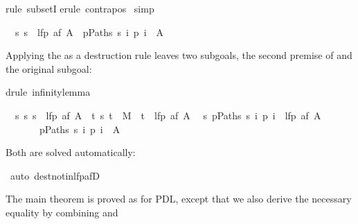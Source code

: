 \begin{isabellebody}
\begin{isamarkuptxt}
\end{isamarkuptxt}%
rule\ subsetI{\isacharparenright}\isanewline
{}erule\ contrapos\isanewline
{}\ simp%
\begin{isamarkuptxt}%
\begin{isabelle}
\ \ {\isasymAnd}s{\isachardot}\ s\ {\isasymnotin}\ lfp\ {\isacharparenleft}af\ A{\isacharparenright}\ {\isasymLongrightarrow}\ {\isasymexists}p{\isasymin}Paths\ s{\isachardot}\ {\isasymforall}i{\isachardot}\ p\ i\ {\isasymnotin}\ A
\end{isabelle}
Applying the  as a destruction rule leaves two subgoals, the second
premise of  and the original subgoal:%
\end{isamarkuptxt}%
drule\ infinity{\isacharunderscore}lemma{\isacharparenright}%
\begin{isamarkuptxt}%
\begin{isabelle}
\ \ {\isasymAnd}s{\isachardot}\ {\isasymforall}s{\isachardot}\ s\ {\isasymnotin}\ lfp\ {\isacharparenleft}af\ A{\isacharparenright}\ {\isasymlongrightarrow}\ {\isacharparenleft}{\isasymexists}t{\isachardot}\ {\isacharparenleft}s{\isacharcomma}\ t{\isacharparenright}\ {\isasymin}\ M\ {\isasymand}\ t\ {\isasymnotin}\ lfp\ {\isacharparenleft}af\ A{\isacharparenright}{\isacharparenright}\isanewline
\ \ {\isasymAnd}s{\isachardot}\ {\isasymexists}p{\isasymin}Paths\ s{\isachardot}\ {\isasymforall}i{\isachardot}\ p\ i\ {\isasymnotin}\ lfp\ {\isacharparenleft}af\ A{\isacharparenright}\isanewline
\ \ \ \ \ \ {\isasymLongrightarrow}\ {\isasymexists}p{\isasymin}Paths\ s{\isachardot}\ {\isasymforall}i{\isachardot}\ p\ i\ {\isasymnotin}\ A
\end{isabelle}
Both are solved automatically:%
\end{isamarkuptxt}%
\ auto\ dest{\isacharcolon}not{\isacharunderscore}in{\isacharunderscore}lfp{\isacharunderscore}afD{\isacharparenright}\isanewline
{}%
\begin{isamarkuptext}%
The main theorem is proved as for PDL, except that we also derive the necessary equality
 by combining  and 

\end{isamarkuptext}
\end{isabellebody}

